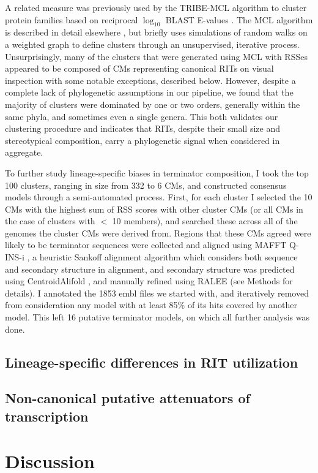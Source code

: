 A related measure was previously used by the TRIBE-MCL algorithm to cluster protein families based on reciprocal $\log_{10}$ BLAST E-values \parencite{Enright2002}. The MCL algorithm is described in detail elsewhere \parencite{VanDongen2008}, but briefly uses simulations of random walks on a weighted graph to define clusters through an unsupervised, iterative process. Unsurprisingly, many of the clusters that were generated using MCL with RSSes appeared to be composed of CMs representing canonical RITs on visual inspection with some notable exceptions, described below. However, despite a complete lack of phylogenetic assumptions in our pipeline, we found that the majority of clusters were dominated by one or two orders, generally within the same phyla, and sometimes even a single genera. This both validates our clustering procedure and indicates that RITs, despite their small size and stereotypical composition, carry a phylogenetic signal when considered in aggregate.

To further study lineage-specific biases in terminator composition, I took the top 100 clusters, ranging in size from 332 to 6 CMs, and constructed consensus models through a semi-automated process. First, for each cluster I selected the 10 CMs with the highest sum of RSS scores with other cluster CMs (or all CMs in the case of clusters with $<$ 10 members), and searched these across all of the genomes the cluster CMs were derived from. Regions that these CMs agreed were likely to be terminator sequences were collected and aligned using MAFFT Q-INS-i \parencite{Katoh2008}, a heuristic Sankoff alignment algorithm which considers both sequence and secondary structure in alignment, and secondary structure was predicted using CentroidAlifold \parencite{Hamada2009}, and manually refined using RALEE \parencite{Griffiths-Jones2005} (see Methods for details). I annotated the 1853 embl files we started with, and iteratively removed from consideration any model with at least 85\% of its hits covered by another model. This left 16 putative terminator models, on which all further analysis was done.

\subsection{Lineage-specific differences in RIT utilization}

\subsection{Non-canonical putative attenuators of transcription}

\section{Discussion}